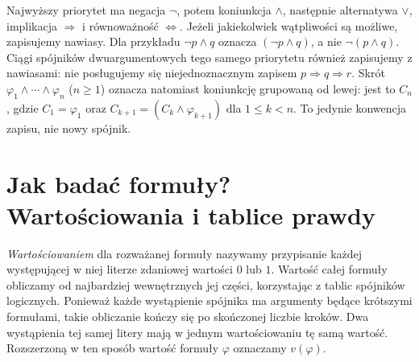 \begin{uwaga}
Najwyższy priorytet ma negacja $\neg$, potem koniunkcja
$\land$, następnie alternatywa $\lor$, implikacja $\Rightarrow$
i równoważność $\Leftrightarrow$. Jeżeli jakiekolwiek wątpliwości
są możliwe, zapisujemy nawiasy. Dla przykładu
$\neg p\land q$ oznacza $(\neg p\land q)$, a nie
$\neg(p\land q)$. Ciągi spójników dwuargumentowych tego samego
priorytetu również zapisujemy z nawiasami: nie posługujemy się
niejednoznacznym zapisem $p\Rightarrow q\Rightarrow r$.
Skrót $\varphi_1\land\cdots\land\varphi_n$ ($n\ge1$)
oznacza natomiast koniunkcję grupowaną od lewej: jest to
$C_n$, gdzie $C_1=\varphi_1$ oraz
$C_{k+1}=(C_k\land\varphi_{k+1})$ dla $1\le k<n$.
To jedynie konwencja zapisu, nie nowy spójnik.
\end{uwaga}

\section{Jak badać formuły? Wartościowania i tablice prawdy}
\label{sec:valuations}
\begin{definicja}[Wartościowanie]\label{def:valuation}
\emph{Wartościowaniem} dla rozważanej formuły nazywamy
przypisanie każdej występującej w niej literze zdaniowej
wartości $0$ lub $1$. Wartość całej formuły obliczamy od
najbardziej wewnętrznych jej części, korzystając z tablic
spójników logicznych. Ponieważ każde wystąpienie spójnika ma
argumenty będące krótszymi formułami, takie obliczanie kończy
się po skończonej liczbie kroków. Dwa wystąpienia tej samej litery
mają w jednym wartościowaniu tę samą wartość. Rozszerzoną
w ten sposób wartość formuły $\varphi$ oznaczamy $v(\varphi)$.
\end{definicja}

